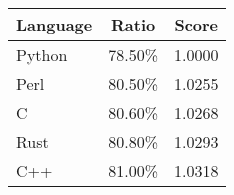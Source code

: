 \centering
\begin{tabular}{|l|c|c|}
    \hline
    Language & Ratio & Score \\
    \hline
    Python & 78.50\% & 1.0000 \\
    Perl & 80.50\% & 1.0255 \\
    C & 80.60\% & 1.0268 \\
    Rust & 80.80\% & 1.0293 \\
    C++ & 81.00\% & 1.0318 \\
    \hline
\end{tabular}
